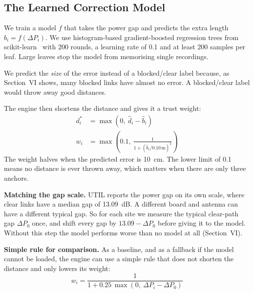 \documentclass[conference]{IEEEtran}
\begin{document}
\subsection{The Learned Correction Model}
We train a model $f$ that takes the power gap and predicts the extra length
$\hat{b}_i = f(\Delta P_i)$. We use histogram-based gradient-boosted
regression trees from scikit-learn~\cite{friedman2001greedy,pedregosa2011scikit}
with 200 rounds, a learning rate of 0.1 and at least 200 samples per leaf.
Large leaves stop the model from memorising single recordings.

We predict the \emph{size} of the error instead of a blocked/clear label
because, as Section~VI shows, many blocked links have almost no error. A
blocked/clear label would throw away good distances.

The engine then shortens the distance and gives it a trust weight:
\begin{align}
d_i^* &= \max(0,\ \hat{d}_i - \hat{b}_i) \\
w_i &= \max\!\left(0.1,\ \frac{1}{1 + (\hat{b}_i / 0.10\,\text{m})^2}\right)
\end{align}
The weight halves when the predicted error is 10~cm. The lower limit of 0.1
means no distance is ever thrown away, which matters when there are only
three anchors.

\textbf{Matching the gap scale.} UTIL reports the power gap on its own
scale, where clear links have a median gap of 13.09~dB. A different board
and antenna can have a different typical gap. So for each site we measure
the typical clear-path gap $\Delta P_0$ once, and shift every gap by
$13.09 - \Delta P_0$ before giving it to the model. Without this step the
model performs worse than no model at all (Section~VI).

\textbf{Simple rule for comparison.} As a baseline, and as a fallback if
the model cannot be loaded, the engine can use a simple rule that does not
shorten the distance and only lowers its weight:
\begin{equation}
w_i = \frac{1}{1 + 0.25\,\max(0,\ \Delta P_i - \Delta P_0)}
\end{equation}
\end{document}
